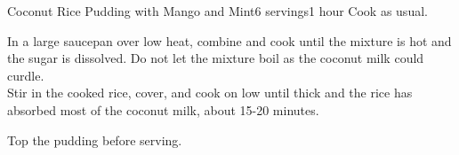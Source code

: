 \documentclass[../Cookbook.tex]{subfiles}
\begin{document}
\begin{recipe}[CoconutRicePudding]{Coconut Rice Pudding with Mango and Mint}{6 servings}{1 hour}
	Cook as usual.

	In a large saucepan over low heat, combine and cook until the mixture is hot and the sugar is dissolved. Do not let the mixture boil as the coconut milk could curdle. \\
	Stir in the cooked rice, cover, and cook on low until thick and the rice has absorbed most of the coconut milk, about 15-20 minutes.

	Top the pudding before serving.
\end{recipe}
\end{document}
